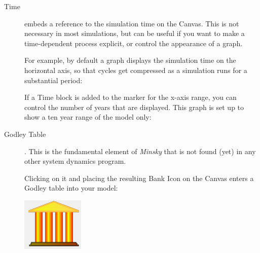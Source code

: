 \begin{description}
\item [{Time}]  embeds a reference to the simulation
time on the Canvas. This is not necessary in most simulations, but
can be useful if you want to make a time-dependent process explicit,
or control the appearance of a graph.

For example, by default a graph displays the simulation time on the
horizontal axis, so that cycles get compressed as a simulation runs
for a substantial period:
\begin{center}
\par\end{center}

If a Time block is added to the marker for the x-axis range, you can
control the number of years that are displayed. This graph is set
up to show a ten year range of the model only:
\begin{center}
\par\end{center}
\item [{Godley Table}] . This is the fundamental
element of \emph{Minsky} that is not found (yet) in any other system
dynamics program.

Clicking on it and placing the resulting Bank Icon on the Canvas enters
a Godley table into your model:
\begin{center}
\includegraphics{images/NewItem29} 
\par\end{center}


\end{description}
